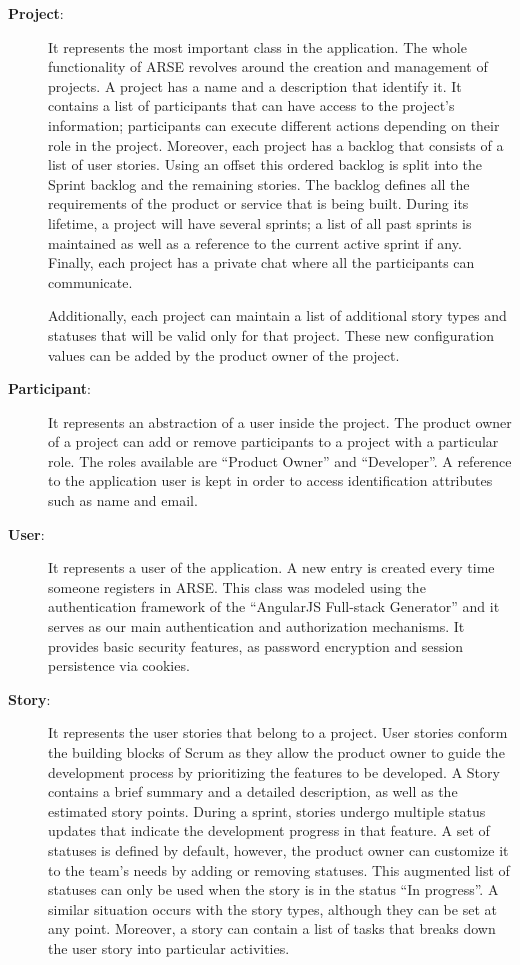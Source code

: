 \documentclass[
	accentcolor=tud1a %
]{tudreport}
\begin{document}
\begin{description}

\item[\textbf{Project}:] It represents the most important class in the application. The whole functionality of ARSE revolves around the creation and management of projects. A project has a name and a description that identify it. It contains a list of participants that can have access to the project's information; participants can execute different actions depending on their role in the project. Moreover, each project has a backlog that consists of a list of user stories. Using an offset this ordered backlog is split into the Sprint backlog and the remaining stories. The backlog defines all the requirements of the product or service that is being built. During its lifetime, a project will have several sprints; a list of all past sprints is maintained as well as a reference to the current active sprint if any. Finally, each project has a private chat where all the participants can communicate.

Additionally, each project can maintain a list of additional story types and statuses that will be valid only for that project. These new configuration values can be added by the product owner of the project.

\item[\textbf{Participant}:] It represents an abstraction of a user inside the project. The product owner of a project can add or remove participants to a project with a particular role. The roles available are ``Product Owner'' and ``Developer''. A reference to the application user is kept in order to access identification attributes such as name and email.

\item[\textbf{User}:] It represents a user of the application. A new entry is created every time someone registers in ARSE. This class was modeled using the authentication framework of the ``AngularJS Full-stack Generator'' \cite{AFSG} and it serves as our main authentication and authorization mechanisms. It provides basic security features, as password encryption and session persistence via cookies.  

\item[\textbf{Story}:] It represents the user stories that belong to a project. User stories conform the building blocks of Scrum as they allow the product owner to guide the development process by prioritizing the features to be developed. A Story contains a brief summary and a detailed description, as well as the estimated story points. During a sprint, stories undergo multiple status updates that indicate the development progress in that feature. A set of statuses is defined by default, however, the product owner can customize it to the team's needs by adding or removing statuses. This augmented list of statuses can only be used when the story is in the status ``In progress''. A similar situation occurs with the story types, although they can be set at any point. Moreover, a story can contain a list of tasks that breaks down the user story into particular activities. 


\end{description}
\end{document}
